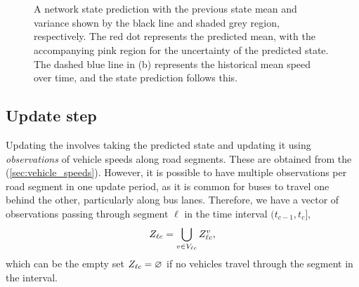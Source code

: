\begin{knitrout}\small
{}\color{fgcolor}\begin{figure}

{\centering {}\\
\\

}

\caption[A network state prediction with the previous state mean and variance shown by the black line and shaded grey region, respectively]{A network state prediction with the previous state mean and variance shown by the black line and shaded grey region, respectively. The red dot represents the predicted mean, with the accompanying pink region for the uncertainty of the predicted state. The dashed blue line in (b) represents the historical mean speed over time, and the state prediction follows this.}\label{fig:nw_kf}
\end{figure}


\end{knitrout}


\subsection{Update step}
\label{sec:kf_update}

Updating the \kf{} involves taking the predicted state and updating it using \emph{observations} of vehicle speeds along road segments. These are obtained from the \pf{} (\cref{sec:vehicle_speeds}). However, it is possible to have multiple observations per road segment in one update period, as it is common for buses to travel one behind the other, particularly along bus lanes. Therefore, we have a vector of observations passing through segment $\ell$ in the time interval $(t_{c-1}, t_c]$,
\begin{equation} \label{eq:nw_seg_obs}
Z_{\ell c} = \bigcup_{v\in V_{\ell c}} Z_{\ell c}^v,
\end{equation}
which can be the empty set $Z_{\ell c} = \varnothing$ if no vehicles travel through the segment in the interval.


